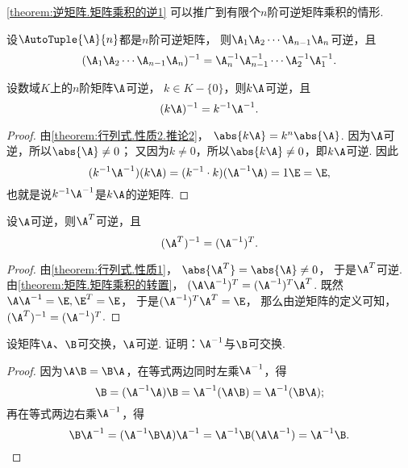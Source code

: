\cref{theorem:逆矩阵.矩阵乘积的逆1} 可以推广到有限个\(n\)阶可逆矩阵乘积的情形.
\begin{property}\label{theorem:逆矩阵.矩阵乘积的逆2}
设\(\AutoTuple{\A}{n}\)都是\(n\)阶可逆矩阵，
则\(\A_1 \A_2 \dotsm \A_{n-1} \A_n\)可逆，且\begin{equation}
	(\A_1 \A_2 \dotsm \A_{n-1} \A_n)^{-1}
	= \A_n^{-1} \A_{n-1}^{-1} \dotsm \A_2^{-1} \A_1^{-1}.
\end{equation}
\end{property}

\begin{property}\label{theorem:逆矩阵.数与矩阵乘积的逆}
设数域\(K\)上的\(n\)阶矩阵\(\A\)可逆，
\(k \in K-\{0\}\)，则\(k\A\)可逆，且
\begin{equation}
	(k \A)^{-1} = k^{-1} \A^{-1}.
\end{equation}
\begin{proof}
由\cref{theorem:行列式.性质2.推论2}，
\(\abs{k\A} = k^n\abs{\A}\).
因为\(\A\)可逆，所以\(\abs{\A}\neq0\)；
又因为\(k\neq0\)，所以\(\abs{k\A}\neq0\)，即\(k\A\)可逆.
因此\[
	(k^{-1}\A^{-1})(k\A)
	= (k^{-1} \cdot k)(\A^{-1}\A)
	= 1 \E = \E,
\]
也就是说\(k^{-1}\A^{-1}\)是\(k\A\)的逆矩阵.
\end{proof}
\end{property}

\begin{property}\label{theorem:逆矩阵.转置矩阵的逆与逆矩阵的转置}
设\(\A\)可逆，则\(\A^T\)可逆，且\begin{equation}
	(\A^T)^{-1} = (\A^{-1})^T.
\end{equation}
\begin{proof}
由\cref{theorem:行列式.性质1}，
\(\abs{\A^T}=\abs{\A}\neq0\)，
于是\(\A^T\)可逆.
由\cref{theorem:矩阵.矩阵乘积的转置}，
\((\A \A^{-1})^T = (\A^{-1})^T \A^T\).
既然\(\A \A^{-1} = \E, \E^T = \E\)，
于是\((\A^{-1})^T \A^T = \E\)，
那么由逆矩阵的定义可知，
\((\A^T)^{-1}=(\A^{-1})^T\).
\end{proof}
\end{property}

\begin{example}
设矩阵\(\A\)、\(\B\)可交换，\(\A\)可逆.
证明：\(\A^{-1}\)与\(\B\)可交换.
\begin{proof}
因为\(\A\B = \B\A\)，在等式两边同时左乘\(\A^{-1}\)，得\[
	\B = (\A^{-1}\A)\B = \A^{-1}(\A\B) = \A^{-1}(\B\A);
\]
再在等式两边右乘\(\A^{-1}\)，得\[
	\B\A^{-1} = (\A^{-1}\B\A)\A^{-1} = \A^{-1}\B(\A\A^{-1}) = \A^{-1}\B.
	\qedhere
\]
\end{proof}
\end{example}

